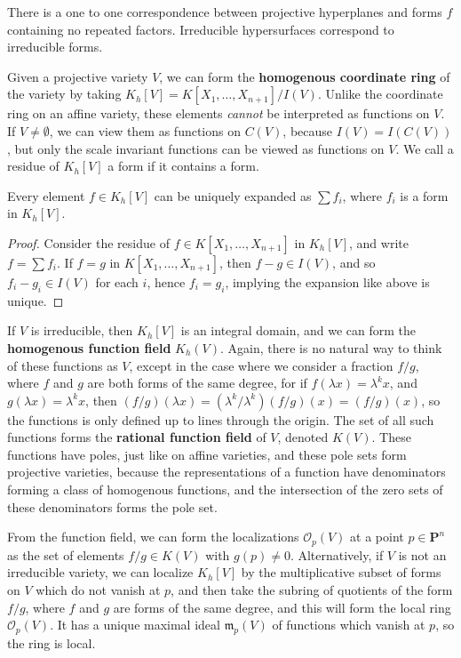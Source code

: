 \begin{corollary}
    There is a one to one correspondence between projective hyperplanes and forms $f$ containing no repeated factors. Irreducible hypersurfaces correspond to irreducible forms.
\end{corollary}

Given a projective variety $V$, we can form the {\bf homogenous coordinate ring} of the variety by taking $K_h[V] = K[X_1, \dots, X_{n+1}]/I(V)$. Unlike the coordinate ring on an affine variety, these elements {\it cannot} be interpreted as functions on $V$. If $V \neq \emptyset$, we can view them as functions on $C(V)$, because $I(V) = I(C(V))$, but only the scale invariant functions can be viewed as functions on $V$. We call a residue of $K_h[V]$ a form if it contains a form.

\begin{prop}
    Every element $f \in K_h[V]$ can be uniquely expanded as $\sum f_i$, where $f_i$ is a form in $K_h[V]$.
\end{prop}
\begin{proof}
    Consider the residue of $f \in K[X_1, \dots, X_{n+1}]$ in $K_h[V]$, and write $f = \sum f_i$. If $f = g$ in $K[X_1, \dots, X_{n+1}]$, then $f - g \in I(V)$, and so $f_i - g_i \in I(V)$ for each $i$, hence $f_i = g_i$, implying the expansion like above is unique.
\end{proof}

If $V$ is irreducible, then $K_h[V]$ is an integral domain, and we can form the {\bf homogenous function field} $K_h(V)$. Again, there is no natural way to think of these functions as $V$, except in the case where we consider a fraction $f/g$, where $f$ and $g$ are both forms of the same degree, for if $f(\lambda x) = \lambda^k x$, and $g(\lambda x) = \lambda^k x$, then $(f/g)(\lambda x) = (\lambda^k/\lambda^k) (f/g)(x) = (f/g)(x)$, so the functions is only defined up to lines through the origin. The set of all such functions forms the {\bf rational function field} of $V$, denoted $K(V)$. These functions have poles, just like on affine varieties, and these pole sets form projective varieties, because the representations of a function have denominators forming a class of homogenous functions, and the intersection of the zero sets of these denominators forms the pole set.

From the function field, we can form the localizations $\mathcal{O}_p(V)$ at a point $p \in \mathbf{P}^n$ as the set of elements $f/g \in K(V)$ with $g(p) \neq 0$. Alternatively, if $V$ is not an irreducible variety, we can localize $K_h[V]$ by the multiplicative subset of forms on $V$ which do not vanish at $p$, and then take the subring of quotients of the form $f/g$, where $f$ and $g$ are forms of the same degree, and this will form the local ring $\mathcal{O}_p(V)$. It has a unique maximal ideal $\mathfrak{m}_p(V)$ of functions which vanish at $p$, so the ring is local.

